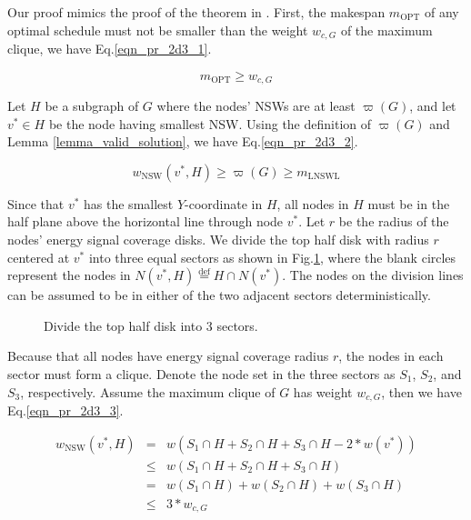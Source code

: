 \documentclass[journal,10pt]{IEEEtran}
\begin{document}
\begin{IEEEproof}
Our proof mimics the proof of the theorem in \cite{Marathe1995}. First, the makespan $m_\text{OPT}$ of any optimal schedule must not be smaller than the weight $w_{c,G}$ of the maximum clique, we have Eq.\eqref{eqn_pr_2d3_1}.

\begin{equation}
\label{eqn_pr_2d3_1}
m_\text{OPT}{\geq}w_{c,G}
\end{equation}

Let $H$ be a subgraph of $G$ where the nodes' NSWs are at least $\varpi(G)$, and let $v^{*}{\in}H$ be the node having smallest NSW. Using the definition of $\varpi(G)$ and Lemma \ref{lemma_valid_solution}, we have Eq.\eqref{eqn_pr_2d3_2}.

\begin{equation}
\label{eqn_pr_2d3_2}
w_\text{NSW}(v^{*},H){\geq}\varpi(G){\geq}m_\text{LNSWL}
\end{equation}

Since that $v^{*}$ has the smallest $Y$-coordinate in $H$, all nodes in $H$ must be in the half plane above the horizontal line through node $v^{*}$. Let $r$ be the radius of the nodes' energy signal coverage disks. We divide the top half disk with radius $r$ centered at $v^{*}$ into three equal sectors as shown in Fig.\ref{fig_2d3part}, where the blank circles represent the nodes in $N(v^{*},H)\mathop{=}\limits^\text{def}H{\cap}N(v^{*})$. The nodes on the division lines can be assumed to be in either of the two adjacent sectors deterministically.

\begin{figure}[htb]
\caption{Divide the top half disk into 3 sectors.}
\label{fig_2d3part}
\end{figure}

Because that all nodes have energy signal coverage radius $r$, the nodes in each sector must form a clique. Denote the node set in the three sectors as $S_1$, $S_2$, and $S_3$, respectively. Assume the maximum clique of $G$ has weight $w_{c,G}$, then we have Eq.\eqref{eqn_pr_2d3_3}.

\begin{equation}
\label{eqn_pr_2d3_3}
\begin{array}{rcl}
w_\text{NSW}(v^{*},H)&{=}&w(S_1{\cap}H{+}S_2{\cap}H{+}S_3{\cap}H{-}2{*}w(v^{*}))\\
&{\leq}&w(S_1{\cap}H{+}S_2{\cap}H{+}S_3{\cap}H)\\
&{=}&w(S_1{\cap}H){+}w(S_2{\cap}H){+}w(S_3{\cap}H)\\
&{\leq}&3{*}w_{c,G}
\end{array}
\end{equation}


\end{IEEEproof}
\end{document}
